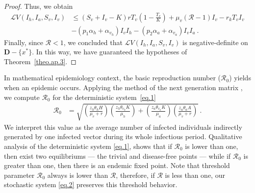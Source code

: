\begin{proof}
	Thus, we obtain
	\begin{align*}
		\mathcal{L}V(I_{h},I_{a},S_{v},I_{v}) 
			&\leq
				\left(
					S_{v} + I_{v} - K
				\right)
				rT_{v}
				\left(
					1 - \frac{T_{v}}{K}
				\right)
				+
				\mu_{v}
				\left(
					\mathcal{R}-1
				\right)
				I_{v} 
				- r_{k} T_{v} I_{v}
				\\ %
				&-
				\left(
					p_{1} \alpha_{h}
					+\alpha_{v_{h}} 
				\right)
				I_{v}I_{h}
				-
				\left(
					p_{2}
					\alpha_{a}
					+\alpha_{v_{a}} 
				\right)
				I_{v} I_{a}~.
	\end{align*}
	Finally, since $\mathcal{R}<1$, we concluded that 
	$\mathcal{L}V(I_{h},I_{a},S_{v},I_{v})$ is negative-definite on 
	$\mathbf{D}-\{x^{*}\}$. In this way, we have guaranteed the hypotheses of 
	Theorem~\ref{theo.ap.3}.
\end{proof}

\begin{remark}
		In mathematical epidemiology context, the basic reproduction number 
	($\mathcal{R}_0$) yields when an epidemic occurs.
	Applying the method of the next generation matrix \cite{VanDenDriessche2002}, 
	we compute $\mathcal{R}_{0}$ for the deterministic system~\eqref{eq.1}
	\begin{align}\label{eq:R_zero}
		\mathcal{R}_{0} &= 
		\sqrt{ 
			\left(
				\frac{z_{h}\theta_{h}H}{\mu_{v}+r}
			\right)
			\left(
				\frac{z_{h}\theta_{v_{h}}K}{\mu_{h}} 
			\right)
			+\left(
				\frac{z_{a}\theta_{v_{a}}K}{\mu_{a}}
			\right)
			\left(
				\frac{z_{a}\theta_{a}A}{\mu_{v}+r}
			\right)
		}~.
	\end{align}
	We interpret this value as the average number of infected individuals 
	indirectly generated by one infected vector during its whole infectious 
	period. Qualitative analysis of the deterministic system \eqref{eq.1}, 
	shows that if $\mathcal{R}_{0}$ is lower than one, then exist two 
	equilibriums --- the trivial and disease-free points --- while if
	 $\mathcal{R}_{0}$ is greater than one, then there is an endemic fixed point.
	Note that threshold parameter $\mathcal{R}_0$ always is lower than 
	$\mathcal{R}$, therefore, if $\mathcal{R}$ is less than one, our stochastic 
	system \eqref{eq.2} preserves this threshold behavior.
\end{remark}
